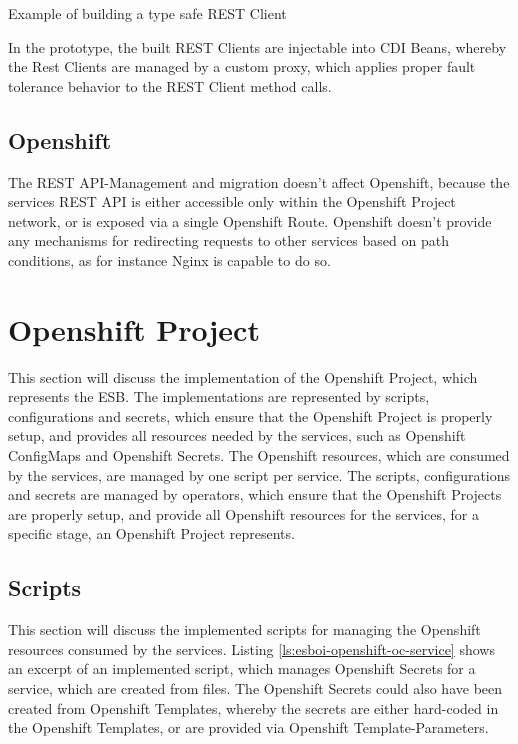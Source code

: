 \begin{listing}[h]
	\caption{Example of building a type safe REST Client}
	\label{ls:esboi-api-client-api-builder-java}
\end{listing}

In the prototype, the built REST Clients are injectable into CDI Beans, whereby the Rest Clients are managed by a custom proxy, which applies proper fault tolerance behavior to the REST Client method calls.

\subsection{Openshift}
\label{sec:esbi-api-openshift}
The REST API-Management and migration doesn't affect Openshift, because the services REST API is either accessible only within the Openshift Project network, or is exposed via a single Openshift Route. Openshift doesn't provide any mechanisms for redirecting requests to other services based on path conditions, as for instance Nginx is capable to do so. 

\section{Openshift Project}
\label{sec:esbi-openshift}
This section will discuss the implementation of the Openshift Project, which represents the ESB. The implementations are represented by scripts, configurations and secrets, which ensure that the Openshift Project is properly setup, and provides all resources needed by the services, such as Openshift ConfigMaps and Openshift Secrets. The Openshift resources, which are consumed by the services, are managed by one script per service. The scripts, configurations and secrets are managed by operators, which ensure that the Openshift Projects are properly setup, and provide all Openshift resources for the services, for a specific stage, an Openshift Project represents.

\subsection{Scripts}
\label{sec:esbi-openshift-secrets}
This section will discuss the implemented scripts for managing the Openshift resources consumed by the services. Listing \vref{ls:esboi-openshift-oc-service} shows an excerpt of an implemented script, which manages Openshift Secrets for a service, which are created from files. The Openshift Secrets could also have been created from Openshift Templates, whereby the secrets are either hard-coded in the Openshift Templates, or are provided via Openshift Template-Parameters.

